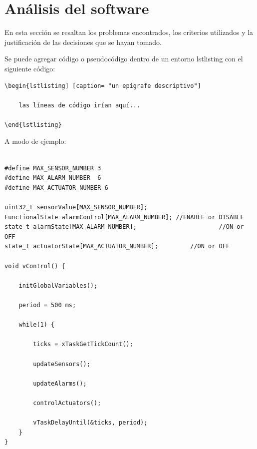 \normalsize


\section{Análisis del software}
 
En esta sección se resaltan los problemas encontrados, los criterios utilizados y la justificación de las decisiones que se hayan tomado.

Se puede agregar código o pseudocódigo dentro de un entorno lstlisting con el siguiente código:

\begin{verbatim}
\begin{lstlisting] [caption= "un epígrafe descriptivo"]

	las líneas de código irían aquí...
	
\end{lstlisting}
\end{verbatim}

A modo de ejemplo:

\begin{lstlisting}[caption=Pseudocódigo del lazo principal de control.]  % Start your code-block

#define MAX_SENSOR_NUMBER 3
#define MAX_ALARM_NUMBER  6
#define MAX_ACTUATOR_NUMBER 6

uint32_t sensorValue[MAX_SENSOR_NUMBER];		
FunctionalState alarmControl[MAX_ALARM_NUMBER];	//ENABLE or DISABLE
state_t alarmState[MAX_ALARM_NUMBER];						//ON or OFF
state_t actuatorState[MAX_ACTUATOR_NUMBER];			//ON or OFF

void vControl() {

	initGlobalVariables();
	
	period = 500 ms;
		
	while(1) {

		ticks = xTaskGetTickCount();
		
		updateSensors();
		
		updateAlarms();
		
		controlActuators();
		
		vTaskDelayUntil(&ticks, period);
	}
}
\end{lstlisting}



